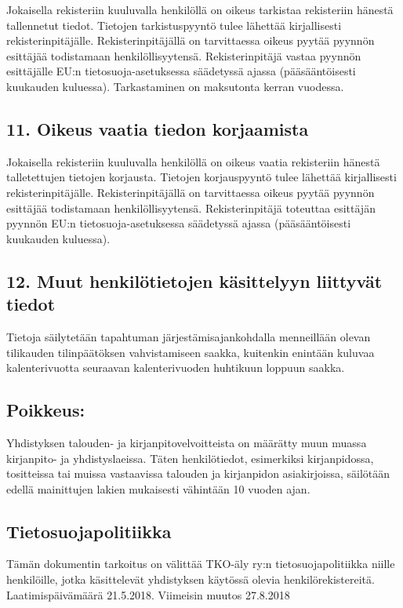 \documentclass[finnish]{tktltiki}
\begin{document}
Jokaisella rekisteriin kuuluvalla henkilöllä on oikeus tarkistaa rekisteriin hänestä tallennetut tiedot. Tietojen tarkistuspyyntö tulee lähettää kirjallisesti rekisterinpitäjälle. Rekisterinpitäjällä on tarvittaessa oikeus pyytää pyynnön esittäjää todistamaan henkilöllisyytensä. Rekisterinpitäjä vastaa pyynnön esittäjälle EU:n tietosuoja-asetuksessa säädetyssä ajassa (pääsääntöisesti kuukauden kuluessa). Tarkastaminen on maksutonta kerran vuodessa.

\subsection*{11. Oikeus vaatia tiedon korjaamista}

Jokaisella rekisteriin kuuluvalla henkilöllä on oikeus vaatia rekisteriin hänestä talletettujen tietojen korjausta. Tietojen korjauspyyntö tulee lähettää kirjallisesti rekisterinpitäjälle. Rekisterinpitäjällä on tarvittaessa oikeus pyytää pyynnön esittäjää todistamaan henkilöllisyytensä. Rekisterinpitäjä toteuttaa esittäjän pyynnön EU:n tietosuoja-asetuksessa säädetyssä ajassa (pääsääntöisesti kuukauden kuluessa).

\subsection*{12. Muut henkilötietojen käsittelyyn liittyvät tiedot}

Tietoja säilytetään tapahtuman järjestämisajankohdalla menneillään olevan tilikauden tilinpäätöksen vahvistamiseen saakka, kuitenkin enintään kuluvaa kalenterivuotta seuraavan kalenterivuoden huhtikuun loppuun saakka.

\subsection*{Poikkeus:}

Yhdistyksen talouden- ja kirjanpitovelvoitteista on määrätty muun muassa kirjanpito- ja yhdistyslaeissa. Täten henkilötiedot, esimerkiksi kirjanpidossa, tositteissa tai muissa vastaavissa talouden ja kirjanpidon asiakirjoissa, säilötään edellä mainittujen lakien mukaisesti vähintään 10 vuoden ajan.


\pagestyle{empty}


\subsection*{Tietosuojapolitiikka}
Tämän dokumentin tarkoitus on välittää TKO-äly ry:n tietosuojapolitiikka niille henkilöille, jotka käsittelevät yhdistyksen käytössä olevia henkilörekistereitä. Laatimispäivämäärä 21.5.2018. Viimeisin muutos 27.8.2018
\end{document}
